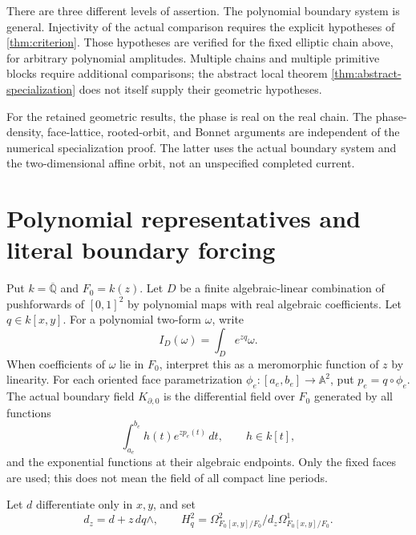 \documentclass[11pt]{article}
\numberwithin{equation}{section}
\theoremstyle{definition}
\theoremstyle{remark}
\newcommand{\Q}{\mathbb Q}
\newcommand{\dd}{\,d}
\newcommand{\Hq}{H_q^2}
\newcommand{\A}{\mathbb A}
\begin{document}
There are three different levels of assertion. The polynomial boundary
system is general. Injectivity of the actual comparison requires the
explicit hypotheses of \cref{thm:criterion}. Those hypotheses are verified
for the fixed elliptic chain above, for arbitrary polynomial amplitudes.
Multiple chains and multiple primitive blocks require additional
comparisons; the abstract local theorem \cref{thm:abstract-specialization}
does not itself supply their geometric hypotheses.

For the retained geometric results, the phase is real on the real chain.
The phase-density, face-lattice, rooted-orbit, and Bonnet arguments are
independent of the numerical specialization proof. The latter uses the
actual boundary system and the two-dimensional affine orbit, not an
unspecified completed current.
\section{Polynomial representatives and literal boundary forcing}
Put $k=\overline{\Q}$ and $F_0=k(z)$. Let $D$ be a finite algebraic-linear
combination of pushforwards of $[0,1]^2$ by polynomial maps with real
algebraic coefficients. Let $q\in k[x,y]$. For a polynomial two-form
$\omega$, write
\[
 I_D(\omega)=\int_D e^{zq}\omega.
\]
When coefficients of $\omega$ lie in $F_0$, interpret this as a meromorphic
function of $z$ by linearity. For each oriented face parametrization
$\phi_e:[a_e,b_e]\to\A^2$, put $p_e=q\circ\phi_e$.
The actual boundary field $K_{\partial,0}$ is the differential field over
$F_0$ generated by all functions
\[
 \int_{a_e}^{b_e} h(t)e^{zp_e(t)}\dd t,\qquad h\in k[t],
\]
and the exponential functions at their algebraic endpoints. Only the fixed
faces are used; this does not mean the field of all compact line periods.

Let $d$ differentiate only in $x,y$, and set
\[
 d_z=d+z\,dq\wedge,\qquad
 \Hq=\Omega^2_{F_0[x,y]/F_0}/d_z\Omega^1_{F_0[x,y]/F_0}.
\]
\end{document}
